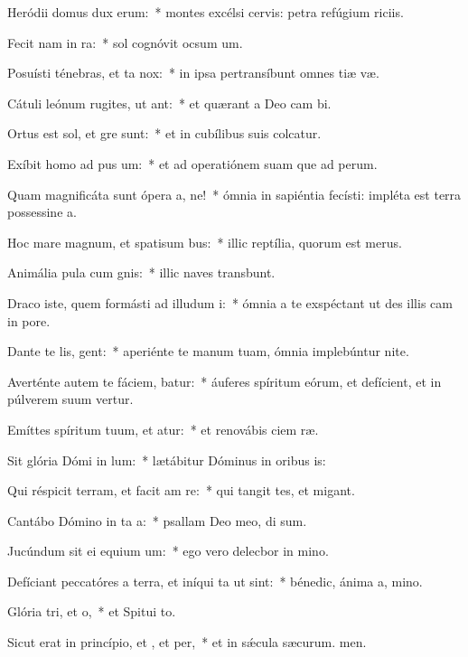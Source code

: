 \item Heródii domus dux  erum:~* montes excélsi cervis: petra refúgium riciis.
\item Fecit nam in ra:~* sol cognóvit ocsum um.
\item Posuísti ténebras, et ta  nox:~* in ipsa pertransíbunt omnes tiæ væ.
\item Cátuli leónum rugites, ut ant:~* et quærant a Deo cam bi.
\item Ortus est sol, et gre sunt:~* et in cubílibus suis colcatur.
\item Exíbit homo ad pus um:~* et ad operatiónem suam que ad perum.
\item Quam magnificáta sunt ópera a, ne!~* ómnia in sapiéntia fecísti: impléta est terra possessine a.
\item Hoc mare magnum, et spatisum bus:~* illic reptília, quorum  est merus.
\item Animália pula cum gnis:~* illic naves transbunt.
\item Draco iste, quem formásti ad illudum i:~* ómnia a te exspéctant ut des illis cam in pore.
\item Dante te lis, gent:~* aperiénte te manum tuam, ómnia implebúntur nite.
\item Averténte autem te fáciem, batur:~* áuferes spíritum eórum, et defícient, et in púlverem suum vertur.
\item Emíttes spíritum tuum, et atur:~* et renovábis ciem ræ.
\item Sit glória Dómi in lum:~* lætábitur Dóminus in oribus is:
\item Qui réspicit terram, et facit am re:~* qui tangit tes, et migant.
\item Cantábo Dómino in ta a:~* psallam Deo meo, di sum.
\item Jucúndum sit ei equium um:~* ego vero delecbor in mino.
\item Defíciant peccatóres a terra, et iníqui ta ut  sint:~* bénedic, ánima a, mino.
\item Glória tri, et o,~* et Spitui to.
\item Sicut erat in princípio, et , et per,~* et in sǽcula sæcurum. men.
